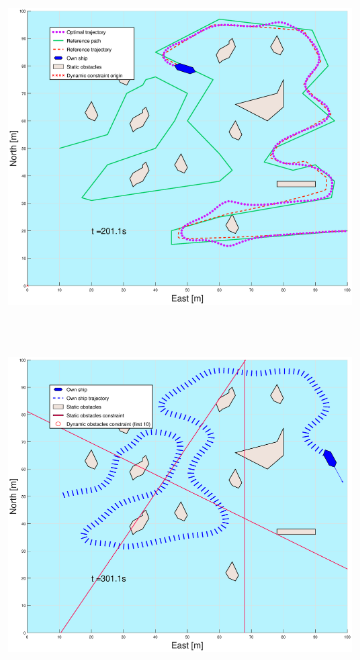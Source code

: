 \begin{figure}[ht]
\begin{subfigure}[b]{0.499\textwidth}
        \includegraphics[width=\textwidth]{Images/Figures/skjergard_u_trafikk/_Simple_1fig999_time=201}
    \end{subfigure}
    \hfill
    \\ 
    \begin{subfigure}[b]{0.49\textwidth}
        \centering
        \includegraphics[width=\textwidth]{Images/Figures/skjergard_u_trafikk/_Simple_1fig1_time=301}

\end{subfigure}
\end{figure}
